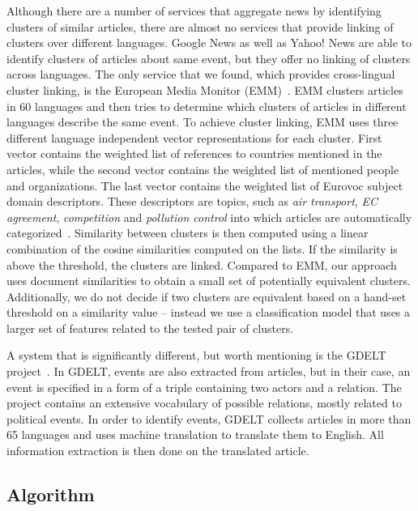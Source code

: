 \documentclass[twoside,11pt]{article}
\begin{document}
Although there are a number of services that aggregate news by identifying clusters of similar articles, there are almost no services that provide linking of clusters over different languages. Google News as well as Yahoo! News are able to identify clusters of articles about same event, but they offer no linking of clusters across languages. The only service that we found, which provides cross-lingual cluster linking, is the European Media Monitor (EMM)~\cite{Steinberger2008}. EMM clusters articles in 60 languages and then tries to determine which clusters of articles in different languages describe the same event. To achieve cluster linking, EMM uses three different language independent vector representations for each cluster. First vector contains the weighted list of references to countries mentioned in the articles, while the second vector contains the weighted list of mentioned people and organizations. The last vector contains the weighted list of Eurovoc subject domain descriptors. These descriptors are topics, such as \emph{air transport}, \emph{EC agreement}, \emph{competition} and \emph{pollution control} into which articles are automatically categorized~. Similarity between clusters is then computed using a linear combination of the cosine similarities computed on the lists. If the similarity is above the threshold, the clusters are linked. Compared to EMM, our approach uses document similarities to obtain a small set of potentially equivalent clusters. Additionally, we do not decide if two clusters are equivalent based on a hand-set threshold on a similarity value -- instead we use a classification model that uses a larger set of features related to the tested pair of clusters.

A system that is significantly different, but worth mentioning is the GDELT project~\cite{Leetaru2013Gdelt}. In GDELT, events are also extracted from articles, but in their case, an event is specified in a form of a triple containing two actors and a relation. The project contains an extensive vocabulary of possible relations, mostly related to political events. In order to identify events, GDELT collects articles in more than 65 languages and uses machine translation to translate them to English. All information extraction is then done on the translated article.

\subsection{Algorithm}
\end{document}
